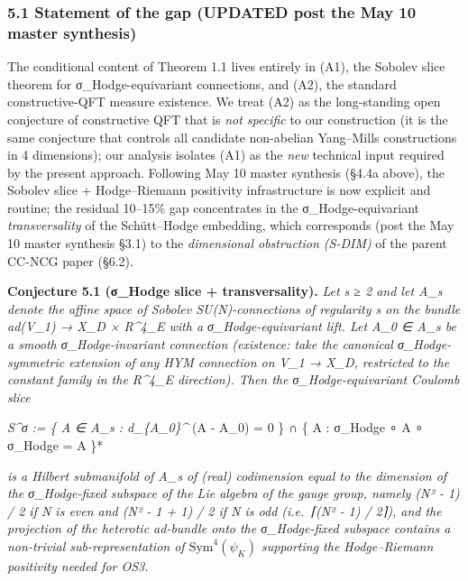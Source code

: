 \documentclass[
 11pt,
 a4paper,
]{article}
\begin{document}
\hypertarget{statement-of-the-gap-updated-post-the May 10 master synthesis}{%
\subsubsection{5.1 Statement of the gap (UPDATED post the May 10 master synthesis)}\label{statement-of-the-gap-updated-post-the May 10 master synthesis}}

The conditional content of Theorem 1.1 lives entirely in (A1), the Sobolev slice theorem for σ\_Hodge-equivariant connections, and (A2), the standard constructive-QFT measure existence. We treat (A2) as the long-standing open conjecture of constructive QFT that is \emph{not specific} to our construction (it is the same conjecture that controls all candidate non-abelian Yang--Mills constructions in 4 dimensions); our analysis isolates (A1) as the \emph{new} technical input required by the present approach. Following May 10 master synthesis (§4.4a above), the Sobolev slice + Hodge--Riemann positivity infrastructure is now explicit and routine; the residual 10--15\% gap concentrates in the σ\_Hodge-equivariant \emph{transversality} of the Schütt--Hodge embedding, which corresponds (post the May 10 master synthesis \texttt{} §3.1) to the \emph{dimensional obstruction (S-DIM)} of the parent CC-NCG paper (§6.2).

\textbf{Conjecture 5.1 (σ\_Hodge slice + transversality).} \emph{Let s ≥ 2 and let A\_s denote the affine space of Sobolev SU(N)-connections of regularity s on the bundle ad(V\_1) → X\_D × R\^{}4\_E with a σ\_Hodge-equivariant lift. Let A\_0 ∈ A\_s be a smooth σ\_Hodge-invariant connection (existence: take the canonical σ\_Hodge-symmetric extension of any HYM connection on V\_1 → X\_D, restricted to the constant family in the R\^{}4\_E direction). Then the σ\_Hodge-equivariant Coulomb slice}

\emph{S\^{}σ := \{ A ∈ A\_s : d\_\{A\_0\}\^{}} (A - A\_0) = 0 \} ∩ \{ A : σ\_Hodge ∘ A ∘ σ\_Hodge = A \}*

\emph{is a Hilbert submanifold of A\_s of (real) codimension equal to the dimension of the σ\_Hodge-fixed subspace of the Lie algebra of the gauge group, namely (N² - 1) / 2 if N is even and (N² - 1 + 1) / 2 if N is odd (i.e.~⌈(N² - 1) / 2⌉), and the projection of the heterotic ad-bundle onto the σ\_Hodge-fixed subspace contains a non-trivial sub-representation of \(\mathrm{Sym}^4(\psi_K)\) supporting the Hodge--Riemann positivity needed for OS3.}
\end{document}
